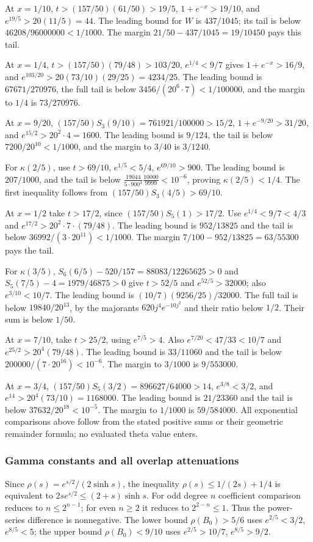 \documentclass[11pt,a4paper]{article}
\numberwithin{equation}{section}
\theoremstyle{definition}\newtheorem{definition}[theorem]{Definition}
\theoremstyle{remark}\newtheorem{remark}[theorem]{Remark}
\begin{document}
At $x=1/10$,
$t>(157/50)(61/50)>19/5$,
$1+e^{-x}>19/10$, and $e^{19/5}>20(11/5)=44$.
The leading bound for $W$ is $437/1045$; its tail is below
$46208/96000000<1/1000$.
The margin $21/50-437/1045=19/10450$ pays this tail.

At $x=1/4$, $t>(157/50)(79/48)>103/20$,
$e^{1/4}<9/7$ gives $1+e^{-x}>16/9$, and
$e^{103/20}>20(73/10)(29/25)=4234/25$.
The leading bound is $67671/270976$, the full tail is below
$3456/(20^6\cdot7)<1/100000$, and the margin to $1/4$ is
$73/270976$.

At $x=9/20$,
$(157/50)S_3(9/10)=761921/100000>15/2$,
$1+e^{-9/20}>31/20$, and $e^{15/2}>20^2\cdot4=1600$.
The leading bound is $9/124$, the tail is below $7200/20^{10}<1/1000$,
and the margin to $3/40$ is $3/1240$.

For $\kappa(2/5)$, use $t>69/10$, $e^{1/5}<5/4$,
$e^{69/10}>900$.
The leading bound is $207/1000$, and the tail is below
$\frac{19044}{5\cdot900^4}\frac{10000}{9999}<10^{-6}$,
proving $\kappa(2/5)<1/4$.
The first inequality follows from $(157/50)S_3(4/5)>69/10$.

At $x=1/2$ take $t>17/2$, since $(157/50)S_5(1)>17/2$.
Use $e^{1/4}<9/7<4/3$ and $e^{17/2}>20^2\cdot7\cdot(79/48)$.
The leading bound is $952/13825$ and the tail is below
$36992/(3\cdot20^{11})<1/1000$.
The margin $7/100-952/13825=63/55300$ pays the tail.

For $\kappa(3/5)$,
$S_6(6/5)-520/157=88083/12265625>0$ and
$S_5(7/5)-4=1979/46875>0$ give $t>52/5$ and
$e^{52/5}>32000$; also $e^{3/10}<10/7$.
The leading bound is $(10/7)(9256/25)/32000$.
The full tail is below $19840/20^{13}$, by the majorants
$620j^4e^{-10j^2}$ and their ratio below $1/2$.
Their sum is below $1/50$.

At $x=7/10$, take $t>25/2$, using $e^{7/5}>4$.
Also $e^{7/20}<47/33<10/7$ and
$e^{25/2}>20^4(79/48)$.
The leading bound is $33/11060$ and the tail is below
$200000/(7\cdot20^{16})<10^{-6}$.
The margin to $3/1000$ is $9/553000$.

At $x=3/4$,
$(157/50)S_5(3/2)=896627/64000>14$,
$e^{3/8}<3/2$, and $e^{14}>20^4(73/10)=1168000$.
The leading bound is $21/23360$ and the tail is below
$37632/20^{18}<10^{-5}$.
The margin to $1/1000$ is $59/584000$.
All exponential comparisons above follow from the stated positive sums or their geometric remainder formula; no evaluated theta value enters.

\subsubsection{Gamma constants and all overlap attenuations}
Since $\rho(s)=e^{s/2}/(2\sinh s)$, the inequality
$\rho(s)\le1/(2s)+1/4$ is equivalent to
$2se^{s/2}\le(2+s)\sinh s$.
For odd degree $n$ coefficient comparison reduces to $n\le2^{n-1}$;
for even $n\ge2$ it reduces to $2^{2-n}\le1$.
Thus the power-series difference is nonnegative.
The lower bound $\rho({B_0})>5/6$ uses $e^{2/5}<3/2$, $e^{8/5}<5$;
the upper bound $\rho({B_0})<9/10$ uses $e^{2/5}>10/7$, $e^{8/5}>9/2$.
\end{document}

